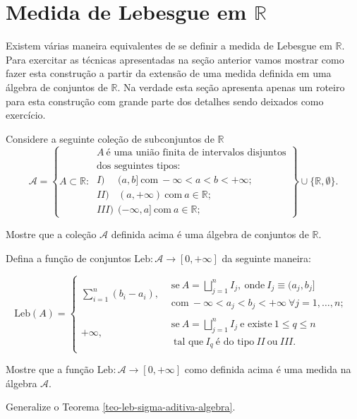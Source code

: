 \section{Medida de Lebesgue em $\mathbb{R}$}


Existem várias maneira equivalentes de se definir a medida 
de Lebesgue em $\mathbb{R}$.
Para exercitar as técnicas apresentadas na seção anterior
vamos mostrar como fazer esta construção a partir da extensão 
de uma medida definida em uma álgebra de conjuntos de $\mathbb{R}$.
Na verdade esta seção apresenta apenas um roteiro para 
esta construção com grande parte dos detalhes sendo deixados 
como exercício.

Considere a seguinte coleção de subconjuntos de $\mathbb{R}$
\[
\mathcal{A}
=
\left\{ 
A\subset \mathbb{R}:\ 
\begin{array}{l}
A\
\text{é uma união finita de intervalos disjuntos}
\\
\text{dos seguintes tipos:}
\\
I)\phantom{II} \ \ (a,b]
\ \text{com}\ -\infty< a<b< +\infty;
\\
II)\phantom{I} \ \ (a,+\infty) \ \text{com}\  a\in\mathbb{R};
\\
III) \ \ (-\infty,a]  \ \text{com}\  a\in\mathbb{R};
\end{array}
\right\}
\cup
\{\mathbb{R},\emptyset\}.
\]



\begin{exercicio}
	Mostre que a coleção $\mathcal{A}$ definida acima é uma 
	álgebra de conjuntos de $\mathbb{R}$.
\end{exercicio}

Defina a função de conjuntos $\textrm{Leb}:\mathcal{A}\to[0,+\infty]$ 
da seguinte maneira:

\[
\textrm{Leb}(A)
=
\begin{cases}
\displaystyle
\sum_{i=1}^n (b_i-a_i),
	&
	\begin{array}{l}
	\text{se} \ A=\bigsqcup_{j=1}^n I_j, \ 
	\text{onde}\  I_j\equiv (a_j,b_j]
	\\
	\text{com}\ -\infty< a_j<b_j< +\infty \ \forall j=1,\ldots,n;
	\end{array}
\\[0.8cm]
+\infty,
	& 
\begin{array}{l}
	\text{se} \ A=\bigsqcup_{j=1}^n I_j\ \text{e existe} \ 1\leq q\leq n 
	\\
	\ \text{tal que}\ I_q\ \text{é do tipo} \ II\ \text{ou}\ III.
\end{array}
\end{cases}
\]



\begin{exercicio}
	Mostre que a função $\mathrm{Leb}:\mathcal{A}\to [0,+\infty]$ como
	definida acima é uma medida na álgebra $\mathcal{A}$.
\end{exercicio}

\noindent{\bf Dica.} Generalize o Teorema \ref{teo-leb-sigma-aditiva-algebra}.







